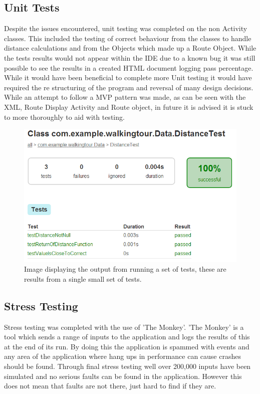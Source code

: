 \subsection{Unit Tests}
Despite the issues encountered, unit testing was completed on the non Activity classes. This included the testing of correct behaviour from the classes to handle distance calculations and from the Objects which made up a Route Object. While the tests results would not appear within the IDE due to a known bug it was still possible to see the results in a created HTML document logging pass percentage. While it would have been beneficial to complete more Unit testing it would have required the re structuring of the program and reversal of many design decisions. While an attempt to follow a MVP pattern was made, as can be seen with the XML, Route Display Activity and Route object, in future it is advised it is stuck to more thoroughly to aid with testing. 

\begin{figure}[H]
\includegraphics[scale=0.5]{Chapter4/unit.png} 
\caption[Test Output]{Image displaying the output from running a set of tests, these are results from a single small set of tests.}
\end{figure}
\subsection{Stress Testing}
Stress testing was completed with the use of 'The Monkey'. 'The Monkey' is a tool which sends a range of inputs to the application and logs the results of this at the end of its run. By doing this the application is spammed with events and any area of the application where hang ups in performance can cause crashes should be found. Through final stress testing well over 200,000 inputs have been simulated and no serious faults can be found in the application. However this does not mean that faults are not there, just hard to find if they are. 

